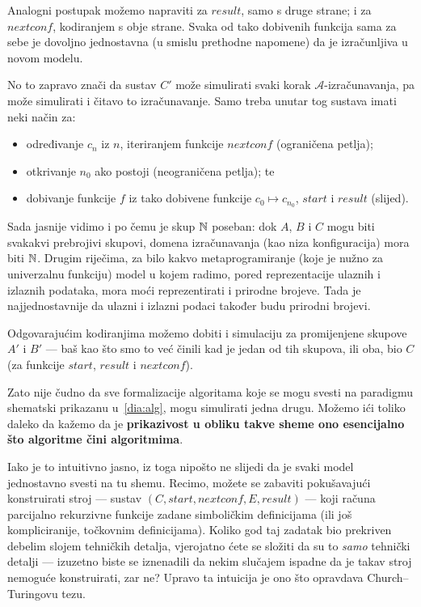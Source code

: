 Analogni postupak možemo napraviti za $result$, samo s druge strane; i za $nextconf$, kodiranjem s obje strane. Svaka od tako dobivenih funkcija sama za sebe je dovoljno jednostavna (u smislu prethodne napomene) da je iz\-ra\-čun\-lji\-va u novom modelu.

No to zapravo znači da sustav $C'$ može simulirati svaki korak $\mathcal A$-izračunavanja, pa može simulirati i čitavo to izračunavanje. Samo treba unutar tog sustava imati neki način za:
\begin{itemize}
    \item određivanje $c_n$ iz $n$, iteriranjem funkcije $nextconf$ (ograničena petlja);
    \item otkrivanje $n_0$ ako postoji (neograničena petlja); te
    \item dobivanje funkcije $f$ iz tako dobivene funkcije $c_0\mapsto c_{n_0}$, $start$ i $result$ (slijed).
\end{itemize}

Sada jasnije vidimo i po čemu je skup ${\mathbb N}$ poseban: dok $A$, $B$ i $C$ mogu biti svakakvi prebrojivi skupovi, domena izračunavanja (kao niza konfiguracija) mora biti ${\mathbb N}$. Drugim riječima, za bilo kakvo metaprogramiranje (koje je nužno za univerzalnu funkciju) model u kojem radimo, pored reprezentacije ulaznih i izlaznih podataka, mora moći reprezentirati i prirodne brojeve. Tada je najjednostavnije da ulazni i izlazni podaci također budu prirodni brojevi.

Odgovarajućim kodiranjima možemo dobiti i simulaciju za promijenjene skupove $A\!'$ i $B'$ --- baš kao što smo to već činili kad je jedan od tih skupova, ili oba, bio $C$ (za funkcije $start$, $result$ i $nextconf$).

Zato nije čudno da sve formalizacije algoritama koje se mogu svesti na paradigmu shematski prikazanu u~\eqref{dia:alg}, mogu simulirati jedna drugu. Možemo ići toliko daleko da kažemo da je \textbf{prikazivost u obliku takve sheme ono esencijalno što algoritme čini algoritmima}.

Iako je to intuitivno jasno, iz toga nipošto ne slijedi da je svaki model jednostavno svesti na tu shemu. Recimo, možete se zabaviti pokušavajući konstruirati stroj --- sustav $(C,start,nextconf,E,result)$ --- koji računa parcijalno rekurzivne funkcije zadane simboličkim definicijama (ili još kompliciranije, točkovnim definicijama). Koliko god taj zadatak bio prekriven debelim slojem tehničkih detalja, vjerojatno ćete se složiti da su to \emph{samo} tehnički detalji --- izuzetno biste se iznenadili da nekim slučajem ispadne da je takav stroj nemoguće konstruirati, zar ne? Upravo ta intuicija je ono što opravdava Church--\!Turingovu tezu.

